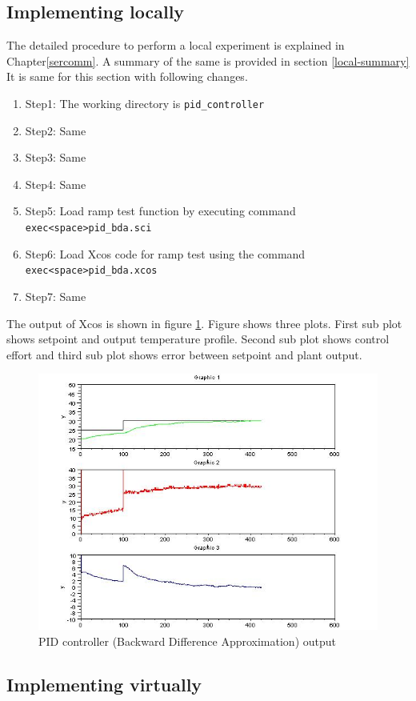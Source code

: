 \subsection{Implementing locally}
The detailed procedure to perform a local experiment is explained in Chapter\ref{sercomm}. A summary of the same is provided in section \ref{local-summary} It is same for this section with following changes.

\begin{enumerate}
\item Step1: The working directory is {\tt  pid\_controller}
\item Step2: Same
\item Step3: Same
\item Step4: Same
\item Step5: Load ramp test function by executing command\\ {\tt exec<space>pid\_bda.sci}
\item Step6: Load Xcos code for ramp test using the command\\ {\tt exec<space>pid\_bda.xcos}
\item Step7: Same
\end{enumerate}

The output of Xcos is shown in figure \ref{pid_bda}.
Figure shows three plots. First sub plot shows setpoint and output temperature profile. Second sub plot shows 
control effort and third sub plot shows error between setpoint and plant output.


\begin{figure}
\centering
\includegraphics[width=0.7\linewidth]{pid_manual/pid_bda_graph}
\caption{PID controller (Backward Difference Approximation) output}
\label{pid_bda}
\end{figure}

\subsection{Implementing virtually}

